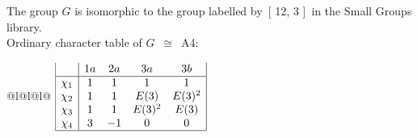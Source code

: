 \documentclass[varwidth=\maxdimen,border=10]{standalone}
\begin{document}
The group $G$ is isomorphic to the group labelled by\ [ 12, 3 ]\ in the Small Groups library.\\
Ordinary character table of $G$\ $\cong$\ A4:\\
\begin{center}
\begin{tabular}{@{}l@{}l@{}l@{}}
\hline
\(\begin{array}{|l|cccc|}
  & 1a & 2a & 3a & 3b\\ \hline
\chi_{1} & 1 & 1 & 1 & 1\\
\chi_{2} & 1 & 1 & E(3) & E(3)^{2}\\
\chi_{3} & 1 & 1 & E(3)^{2} & E(3)\\
\chi_{4} & 3 & -1 & 0 & 0\\
\hline
\end{array}\)\\
\end{tabular}
\end{center}
\end{document}
